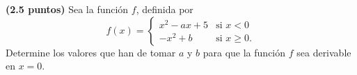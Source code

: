 
\textbf{(2.5 puntos)} Sea la función $f$, definida por
\[
f(x)=\begin{cases}
x^2-ax+5 & \text{si }x<0\\[5pt]
-x^2+b & \text{si }x\geq0.
\end{cases}
\]
Determine los valores que han de tomar $a$ y $b$ para que la función $f$ sea derivable en $x=0$.
